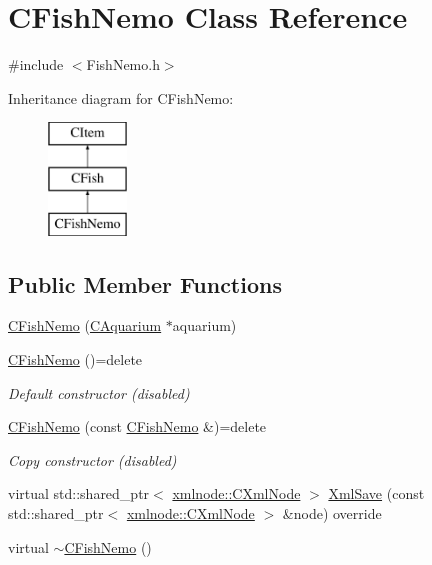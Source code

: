 \hypertarget{class_c_fish_nemo}{}\section{C\+Fish\+Nemo Class Reference}
\label{class_c_fish_nemo}


{\ttfamily \#include $<$Fish\+Nemo.\+h$>$}

Inheritance diagram for C\+Fish\+Nemo\+:\begin{figure}[H]
\begin{center}
\leavevmode
\includegraphics[height=3.000000cm]{class_c_fish_nemo}
\end{center}
\end{figure}
\subsection*{Public Member Functions}
\begin{DoxyCompactItemize}
\item 
\mbox{\hyperlink{class_c_fish_nemo_ab5cc8d119b0c9d8dc62a0e2b6f6e731d}{C\+Fish\+Nemo}} (\mbox{\hyperlink{class_c_aquarium}{C\+Aquarium}} $\ast$aquarium)
\item 
\mbox{\label{class_c_fish_nemo_abb741271acb8aeb31fea93f5048d171e}} 
\mbox{\hyperlink{class_c_fish_nemo_abb741271acb8aeb31fea93f5048d171e}{C\+Fish\+Nemo}} ()=delete
\begin{DoxyCompactList}\small\item\em Default constructor (disabled) \end{DoxyCompactList}\item 
\mbox{\label{class_c_fish_nemo_a354e7fcb47bbf51c30c148c77dfbb59b}} 
\mbox{\hyperlink{class_c_fish_nemo_a354e7fcb47bbf51c30c148c77dfbb59b}{C\+Fish\+Nemo}} (const \mbox{\hyperlink{class_c_fish_nemo}{C\+Fish\+Nemo}} \&)=delete
\begin{DoxyCompactList}\small\item\em Copy constructor (disabled) \end{DoxyCompactList}\item 
virtual std\+::shared\+\_\+ptr$<$ \mbox{\hyperlink{classxmlnode_1_1_c_xml_node}{xmlnode\+::\+C\+Xml\+Node}} $>$ \mbox{\hyperlink{class_c_fish_nemo_ae9fd9446cd4852c9d9a78831bec0f32f}{Xml\+Save}} (const std\+::shared\+\_\+ptr$<$ \mbox{\hyperlink{classxmlnode_1_1_c_xml_node}{xmlnode\+::\+C\+Xml\+Node}} $>$ \&node) override
\item 
virtual \mbox{\hyperlink{class_c_fish_nemo_ac37da91b4738144d3b47674450861b26}{$\sim$\+C\+Fish\+Nemo}} ()
\end{DoxyCompactItemize}
